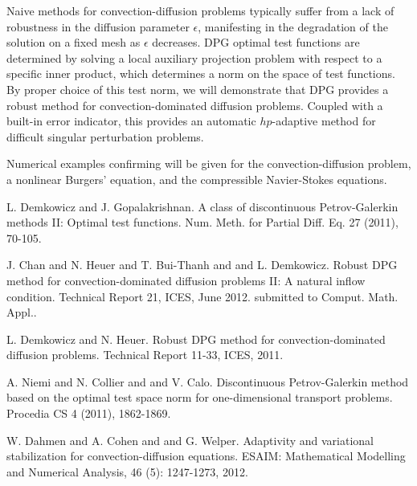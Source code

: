 \documentclass[article, A4, 11pt]{llncs}%
\begin{document}
Naive methods for convection-diffusion problems typically suffer from a lack of robustness in the diffusion parameter $\epsilon$, manifesting in the degradation of the solution on a fixed mesh as $\epsilon$ decreases.  DPG optimal test functions are determined by solving a local auxiliary projection problem with respect to a specific inner product, which determines a norm on the space of test functions.  By proper choice of this test norm, we will demonstrate that DPG provides a robust method for convection-dominated diffusion problems.  Coupled with a built-in error indicator, this provides an automatic $hp$-adaptive method for difficult singular perturbation problems.

Numerical examples confirming will be given for the convection-diffusion problem, a nonlinear Burgers' equation, and the compressible Navier-Stokes equations.  


\begin{thebibliography}{10}
{\sc L. Demkowicz and J. Gopalakrishnan}. {A class of discontinuous Petrov-Galerkin methods II: Optimal test functions}. Num. Meth. for Partial Diff. Eq. 27 (2011), 70-105.

{\sc J. Chan and N. Heuer and T. Bui-Thanh and and L. Demkowicz}. {Robust DPG method for convection-dominated diffusion problems II: A natural inflow condition}. Technical Report 21, ICES, June 2012. submitted to Comput. Math. Appl..

{\sc L. Demkowicz and N. Heuer}. {Robust DPG method for convection-dominated diffusion problems}. Technical Report 11-33, ICES, 2011.

{\sc A. Niemi and N. Collier and and V. Calo}. {Discontinuous Petrov-Galerkin method based on the optimal test space norm for one-dimensional transport problems}. Procedia CS 4 (2011), 1862-1869.

{\sc W. Dahmen and A. Cohen and and G. Welper}. {Adaptivity and variational stabilization for convection-diffusion equations}. ESAIM: Mathematical Modelling and Numerical Analysis, 46 (5): 1247-1273, 2012.
\end{thebibliography} %
\end{document}
